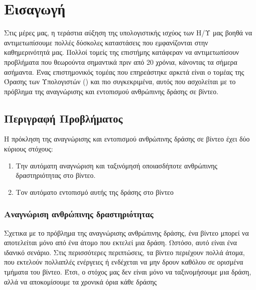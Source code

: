 



% 
\gr
\chapter{Εισαγωγή}
Στις μέρες μας, η τεράστια αύξηση της υπολογιστικής ισχύος των Η/Υ μας βοηθά να αντιμετωπίσουμε πολλές δύσκολες καταστάσεις που εμφανίζονται στην καθημερινότητά μας.
Πολλοί τομείς της επιστήμης κατάφεραν να αντιμετωπίσουν  προβλήματα που θεωρούντα σημαντικά πριν από 20 χρόνια, κάνοντας τα σήμερα  ασήμαντα. Ένας επιστημονικός τομέας που επηρεάστηκε
αρκετά είναι ο τομέας της Όρασης των Υπολογιστών () και πιο συγκεκριμένα, αυτός που ασχολείται με το πρόβλημα της αναγνώρισης και  εντοπισμού ανθρώπινης δράσης σε βίντεο.
\section{Περιγραφή Προβλήματος}
H πρόκληση της αναγνώρισης και εντοπισμού ανθρώπινης δράσης σε βίντεο έχει δύο κύριους στόχους:
\begin{enumerate}
\item Την αυτόματη αναγνώριση και ταξινόμησή οποιασδήποτε ανθρώπινης δραστηριότητας στο βίντεο.
\item Τον αυτόματο εντοπισμό αυτής της δράσης στο βίντεο
\end{enumerate}


\subsection{Αναγνώριση ανθρώπινης δραστηριότητας}
Σχετικα με το πρόβλημα της  αναγνώρισης ανθρώπινης δράσης, ένα βίντεο μπορεί να αποτελείται μόνο από ένα άτομο που εκτελεί μια δράση. Ωστόσο, αυτό είναι ένα ιδανικό
σενάριο. Στις περισσότερες περιπτώσεις, τα βίντεο περιέχουν πολλά άτομα, που εκτελούν πολλαπλές ενέργειες ή ενδέχεται να μην δρουν καθόλου σε ορισμένα τμήματα
του βίντεο.
Έτσι, ο στόχος μας δεν είναι μόνο να ταξινομήσουμε μια δράση, αλλά να αποκομίσουμε τα χρονικά όρια κάθε δράσης

